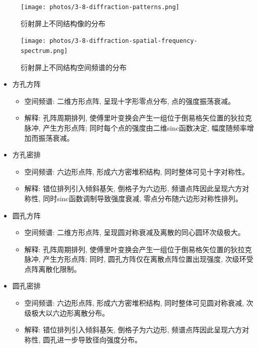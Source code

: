 \documentclass[12pt]{article}
\numberwithin{equation}{section}
\numberwithin{figure}{section}
\begin{document}
\begin{figure}[ht!]
    \centering
    \texttt{[image: photos/3-8-diffraction-patterns.png]} 
    \caption{衍射屏上不同结构像的分布}
    \label{fig:experiment1}
\end{figure}

\begin{figure}[ht!]
    \centering
    \texttt{[image: photos/3-8-diffraction-spatial-frequency-spectrum.png]} 
    \caption{衍射屏上不同结构空间频谱的分布}
    \label{fig:experiment2}
\end{figure}

\begin{itemize}

    \item 方孔方阵
    \begin{itemize}
        \item 空间频谱: 二维方形点阵, 呈现十字形零点分布, 点的强度振荡衰减。
        \item 解释: 孔阵周期排列, 使傅里叶变换会产生一组位于倒易格矢位置的狄拉克脉冲, 产生方形点阵; 同时每个点的强度由二维sinc函数决定, 幅度随频率增加而振荡衰减。
    \end{itemize}

    \item 方孔密排
    \begin{itemize}
        \item 空间频谱: 六边形点阵, 形成六方密堆积结构, 同时整体可见十字对称性。
        \item 解释: 错位排列引入倾斜基矢, 倒格子为六边形, 频谱点阵因此呈现六方对称性, 同时sinc函数调制导致强度衰减, 零点分布随六边形对称性排列。
    \end{itemize}

    \item 圆孔方阵
    \begin{itemize}
        \item 空间频谱: 二维方形点阵, 呈现圆对称衰减及离散的同心圆环次级极大。
        \item 解释: 孔阵周期排列, 使傅里叶变换会产生一组位于倒易格矢位置的狄拉克脉冲, 产生方形点阵; 同时, 圆孔方阵仅在离散点阵位置出现强度, 次级环受点阵离散化限制。
    \end{itemize}

    \item 圆孔密排
    \begin{itemize}
        \item 空间频谱: 六边形点阵, 形成六方密堆积结构, 同时整体可见圆对称衰减, 次级极大以六边形离散分布。
        \item 解释: 错位排列引入倾斜基矢, 倒格子为六边形, 频谱点阵因此呈现六方对称性, 圆孔进一步导致径向强度分布。
    \end{itemize}

\end{itemize}
\end{document}
